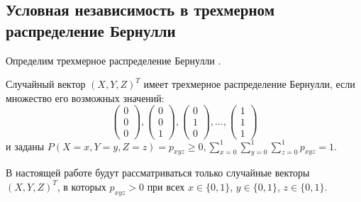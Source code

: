 \subsection{Условная независимость в трехмерном распределение Бернулли}\label{ci_and_bernoulli}

Определим трехмерное распределение Бернулли \cite{Dai2013, Teugels1990}.
\begin{definition}
    Случайный вектор $(X,Y,Z)^T$ имеет трехмерное распределение Бернулли,
    если множество его возможных значений:
    $$
        \begin{pmatrix}
            0 \\
            0 \\
            0
        \end{pmatrix},
        \begin{pmatrix}
            0 \\
            0 \\
            1
        \end{pmatrix},
        \begin{pmatrix}
            0 \\
            1 \\
            0
        \end{pmatrix}, \ldots, \begin{pmatrix}
            1 \\
            1 \\
            1
        \end{pmatrix}
    $$ и заданы $P(X=x,Y=y,Z=z)=p_{xyz} \geq 0,  \sum_{x=0}^1 \sum_{y=0}^1 \sum_{z=0}^1 p_{xyz} =1$.
\end{definition}
В настоящей работе будут рассматриваться
только случайные векторы $(X,Y,Z)^T$, в которых
$p_{xyz}>0$ при всех 
$x \in \{0,1\}$, $y\in \{0,1\}$, $z\in \{0,1\}$.

